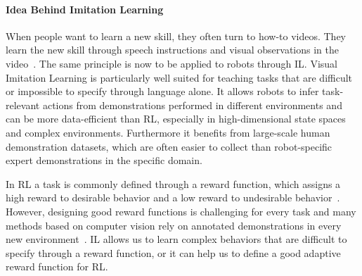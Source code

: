 \paragraph{Idea Behind Imitation Learning} 
When people want to learn a new skill, they often turn to how-to videos. They learn the new skill through speech instructions and visual observations in the video~\cite{Jain2024Vid2RobotEV}. The same principle is now to be applied to robots through \ac{IL}.
Visual Imitation Learning is particularly well suited for teaching tasks that are difficult or impossible to specify through language alone.
It allows robots to infer task-relevant actions from demonstrations performed in different environments and can be more data-efficient than \ac{RL}, especially in high-dimensional state spaces and complex environments. Furthermore it benefits from large-scale human demonstration datasets, which are often easier to collect than robot-specific expert demonstrations in the specific domain\cite{Jain2024Vid2RobotEV}.

In \ac{RL} a task is commonly defined through a reward function, which assigns a high reward to desirable behavior and a low reward to undesirable behavior~\cite{sutton2018reinforcement}. However, designing good reward functions is challenging for every task and many methods based on computer vision rely on annotated demonstrations in every new environment~\cite{McCarthy_2025}. \ac{IL} allows us to learn complex behaviors that are difficult to specify through a reward function, or it can help us to define a good adaptive reward function for \ac{RL}.


